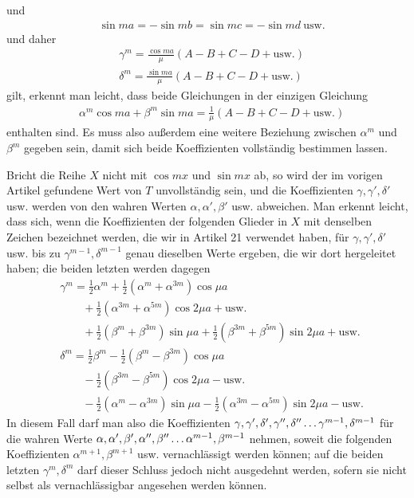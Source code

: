 und
\[
\begin{aligned}
&\sin ma=-\sin mb=\sin mc=-\sin md\ \mathrm{usw.}
\end{aligned}
\]
und daher
\[
\begin{aligned}
&\gamma^m=\frac{\cos ma}{\mu}(A-B+C-D+\mathrm{usw.})\\[5pt]
&\delta^m=\frac{\sin ma}{\mu}(A-B+C-D+\mathrm{usw.})
\end{aligned}
\]
gilt, erkennt man leicht, dass beide Gleichungen in der einzigen Gleichung
\[
\begin{aligned}
&\alpha^m\cos ma+\beta^m\sin ma=\frac1\mu(A-B+C-D+\mathrm{usw.})
\end{aligned}
\]
enthalten sind. Es muss also außerdem eine weitere Beziehung zwischen $\alpha^m$ und $\beta^m$ gegeben sein, damit sich beide Koeffizienten vollständig bestimmen lassen.

Bricht die Reihe $X$ nicht mit $\cos mx$ und $\sin mx$ ab, so wird der im vorigen Artikel gefundene Wert von $T$
unvollständig sein, und die Koeffizienten $\gamma,\gamma',\delta'$ usw. werden von den wahren Werten
$\alpha,\alpha',\beta'$ usw. abweichen. Man erkennt leicht, dass sich, wenn die Koeffizienten der folgenden Glieder in $X$ mit denselben Zeichen bezeichnet werden, die wir in Artikel 21 verwendet haben,
für $\gamma,\gamma',\delta'$ usw. bis zu $\gamma^{m-1},\delta^{m-1}$ genau dieselben Werte ergeben,
die wir dort hergeleitet haben; die beiden letzten werden dagegen
\[
\begin{aligned}
&\gamma^m=\frac12\alpha^m+\frac12(\alpha^m+\alpha^{3m})\cos\mu a\\[5pt]&\qquad{}+\frac12(\alpha^{3m}+\alpha^{5m})\cos2\mu a+\mathrm{usw.}\\[5pt]
&\qquad +\frac12(\beta^m+\beta^{3m})\sin\mu a+\frac12(\beta^{3m}+\beta^{5m})\sin2\mu a+\mathrm{usw.}\\[5pt]
&\delta^m=\frac12\beta^m-\frac12(\beta^m-\beta^{3m})\cos\mu a\\[5pt]&\qquad{}-\frac12(\beta^{3m}-\beta^{5m})\cos2\mu a-\mathrm{usw.}\\[5pt]
&\qquad -\frac12(\alpha^m-\alpha^{3m})\sin\mu a-\frac12(\alpha^{3m}-\alpha^{5m})\sin2\mu a-\mathrm{usw.}
\end{aligned}
\]
In diesem Fall darf man also die Koeffizienten $\gamma,\gamma',\delta',\gamma'',\delta''\mathinner{.\,.\,.}\gamma^{m-1},\delta^{m-1}$ für die wahren Werte
$\alpha,\alpha',\beta',\alpha'',\beta''\mathinner{.\,.\,.}\alpha^{m-1},\beta^{m-1}$ nehmen, soweit die folgenden Koeffizienten $\alpha^{m+1},\beta^{m+1}$ usw.
vernachlässigt werden können; auf die beiden letzten $\gamma^m,\delta^m$ darf dieser Schluss jedoch nicht ausgedehnt werden, sofern sie nicht selbst als vernachlässigbar angesehen werden können.

\endgroup
